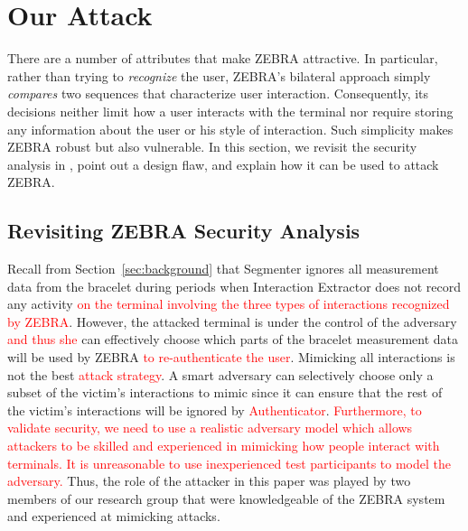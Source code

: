 \documentclass[conference]{IEEEtran}
\newcommand{\zebra}{ZEBRA\xspace}
\newcommand\changeOtto[1]{\textcolor{red}{#1}}
\newcommand\changeMika[1]{\textcolor{red}{#1}}
\newcommand\changeAsokan[1]{\textcolor{red}{#1}}
\newcommand\changeOtto[1]{{#1}}
\newcommand\changeMika[1]{{#1}}
\newcommand\changeAsokan[1]{{#1}}
\begin{document}
 

\section{Our Attack}
\label{sec:attack_overview}



There are a number of attributes that make \zebra attractive. In
particular, rather than trying to \textit{recognize} the user,
\zebra's bilateral approach simply \textit{compares} two sequences
that characterize user interaction. Consequently, its decisions neither limit how a user interacts with the terminal nor require storing any information about the user or his style of interaction. Such simplicity makes \zebra robust but also vulnerable. In this section, we revisit the security analysis in \cite{mare2014zebra}, point out a design flaw, and explain how it can be used to attack \zebra.

\subsection{Revisiting \zebra Security Analysis}
\label{sec:revisiting_zebra}

Recall from Section~\ref{sec:background} that Segmenter ignores all measurement data from the bracelet during periods when Interaction Extractor does not record any activity \changeAsokan{on the terminal involving the three types of interactions recognized by \zebra}. However, the attacked terminal is under the control of the adversary \changeMika{and thus she} can effectively choose which parts of the bracelet measurement data will be used by \zebra\changeMika{ to re-authenticate the user}. 
Mimicking all interactions is not the best \changeAsokan{attack strategy}. 
A smart adversary can selectively choose only a subset of the victim's interactions to mimic since it can ensure that the rest of the victim's interactions will be ignored by \changeAsokan{Authenticator}. \changeOtto{Furthermore,} \changeMika{to validate security,} 
\changeAsokan{we need to use a realistic adversary model which allows attackers to be skilled and experienced in mimicking how people interact with terminals. It is unreasonable to use inexperienced test participants to model the adversary.} 
Thus, the role of the attacker in this paper was played by two members of our research group that were knowledgeable of the \zebra system and experienced at mimicking attacks.
\end{document}

